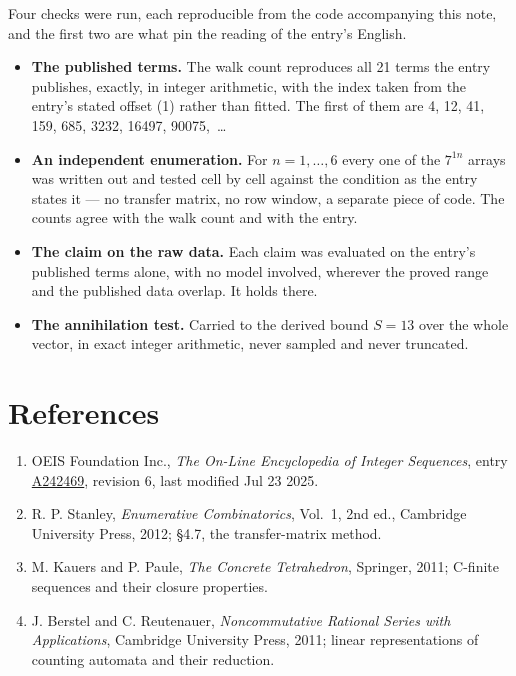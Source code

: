 \documentclass[11pt]{article}
\theoremstyle{definition}
\begin{document}
Four checks were run, each reproducible from the code accompanying this note, and the first two are what pin the reading of the entry's English.

\begin{itemize}

\item {\bfseries The published terms.} The walk count reproduces all 21 terms the entry publishes, exactly, in integer arithmetic, with the index taken from the entry's stated offset (1) rather than fitted. The first of them are 4, 12, 41, 159, 685, 3232, 16497, 90075,~\dots

\item {\bfseries An independent enumeration.} For $n = 1,\dots,6$ every one of the $7^{1n}$ arrays was written out and tested cell by cell against the condition as the entry states it --- no transfer matrix, no row window, a separate piece of code. The counts agree with the walk count and with the entry.

\item {\bfseries The claim on the raw data.} Each claim was evaluated on the entry's published terms alone, with no model involved, wherever the proved range and the published data overlap. It holds there.

\item {\bfseries The annihilation test.} Carried to the derived bound $S = 13$ over the whole vector, in exact integer arithmetic, never sampled and never truncated.

\end{itemize}

\section{References}

\begin{enumerate}

\item OEIS Foundation Inc., \emph{The On-Line Encyclopedia of Integer Sequences}, entry \href{https://oeis.org/A242469}{A242469}, revision 6, last modified Jul 23 2025.

\item R. P. Stanley, \emph{Enumerative Combinatorics}, Vol.~1, 2nd ed., Cambridge University Press, 2012; \S4.7, the transfer-matrix method.

\item M. Kauers and P. Paule, \emph{The Concrete Tetrahedron}, Springer, 2011; C-finite sequences and their closure properties.

\item J. Berstel and C. Reutenauer, \emph{Noncommutative Rational Series with Applications}, Cambridge University Press, 2011; linear representations of counting automata and their reduction.

\end{enumerate}
\end{document}
